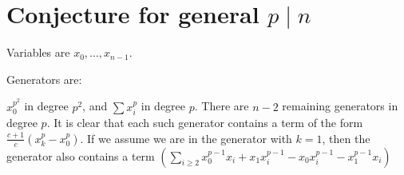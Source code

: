 \documentclass{article}
\numberwithin{equation}{section}
\begin{document}
%
%
%
%
%
%
%
%
%
%
%
%
%
%
%
%


\section{Conjecture for general $p \mid n$}

Variables are $x_0,\dots,x_{n-1}$.

Generators are:

$x_0^{p^2}$ in degree $p^2$, and $\sum x_i^p$ in degree $p$. There are $n-2$ remaining generators in degree $p$. It is clear that each such generator contains a term of the form $\frac{c+1}{c}(x_k^p-x_0^p)$. If we assume we are in the generator with $k=1$, then the generator also contains a term $\left(\sum_{i \ge 2} x_0^{p-1}x_i+x_1x_i^{p-1}-x_0x_i^{p-1}-x_1^{p-1}x_i\right)$
\end{document}
